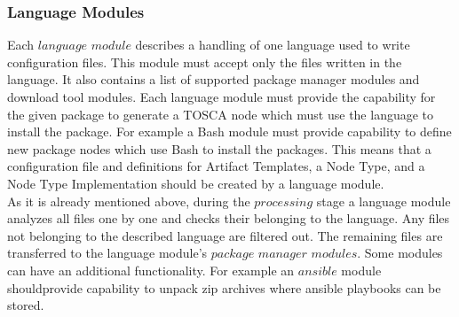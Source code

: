 \subsubsection{Language Modules} \label{subs:archlm}
Each $language$ $module$ describes a handling of one language used to write configuration files.
This module must accept only the files written in the language.
It also contains a list of supported package manager modules and download tool modules.
Each language module must provide the capability for the given package to generate a TOSCA node which must use the language to install the package.
For example a Bash module must provide capability to define new package nodes which use Bash to install the packages.
This means that a configuration file and definitions for Artifact Templates, a Node Type, and a Node Type Implementation should be created by a language module.\\
As it is already mentioned above, during the $processing$ stage a language module analyzes all files one by one and checks their belonging to the language. 
Any files not belonging to the described language are filtered out.
The remaining files are transferred to the language module's $package$ $manager$ $modules$.
Some modules can have an additional functionality.
For example an $ansible$ module shouldprovide capability to unpack zip archives where ansible playbooks can be stored.

